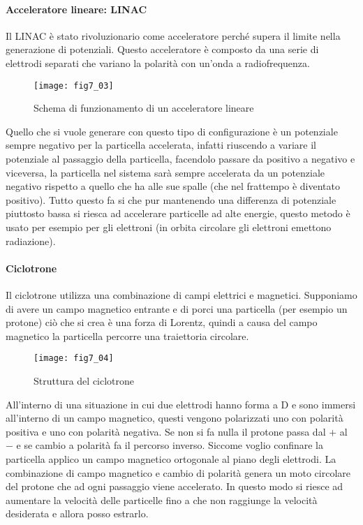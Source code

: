 \paragraph{Acceleratore lineare: LINAC}
Il LINAC è stato rivoluzionario come acceleratore perché supera il limite nella generazione di potenziali.
Questo acceleratore è composto da una serie di elettrodi separati che variano la polarità con un'onda a radiofrequenza.
\begin{figure}[h]
\centering
\texttt{[image: fig7\_03]}
\caption{Schema di funzionamento di un acceleratore lineare}
\end{figure}

Quello che si vuole generare con questo tipo di configurazione è un potenziale sempre negativo per la particella accelerata, infatti riuscendo a variare il potenziale al passaggio della particella, facendolo passare da positivo a negativo e viceversa, la particella nel sistema sarà sempre accelerata da un potenziale negativo rispetto a quello che ha alle sue spalle (che nel frattempo è diventato positivo).
Tutto questo fa si che pur mantenendo una differenza di potenziale piuttosto bassa si riesca ad accelerare particelle ad alte energie, questo metodo è usato per esempio per gli elettroni (in orbita circolare gli elettroni emettono radiazione).

\paragraph{Ciclotrone}
Il ciclotrone utilizza una combinazione di campi elettrici e magnetici.
Supponiamo di avere un campo magnetico entrante e di porci una particella (per esempio un protone) ciò che si crea è una forza di Lorentz, quindi a causa del campo magnetico la particella percorre una traiettoria circolare.
\begin{figure}[h]
\centering
\texttt{[image: fig7\_04]}
\caption{Struttura del ciclotrone}
\end{figure}

All'interno di una situazione in cui due elettrodi hanno forma a D e sono immersi all'interno di un campo magnetico, questi vengono polarizzati uno con polarità positiva e uno con polarità negativa.
Se non si fa nulla il protone passa dal $+$ al $-$ e se cambio a polarità fa il percorso inverso.
Siccome voglio confinare la particella  applico un campo magnetico ortogonale al piano degli elettrodi.
La combinazione di campo magnetico e cambio di polarità genera un moto circolare del protone che ad ogni passaggio viene accelerato.
In questo modo si riesce ad aumentare la velocità delle particelle fino a che non raggiunge la velocità desiderata e allora posso estrarlo.

